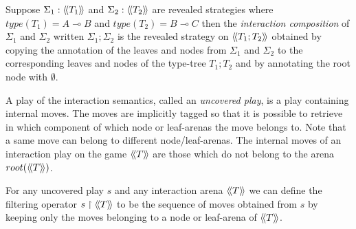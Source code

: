 \begin{dfn}
Suppose $\Sigma_1 : {\langle\!\langle T_1 \rangle\!\rangle}$ and $\Sigma_2 : {\langle\!\langle T_2 \rangle\!\rangle}$
are revealed strategies where $type(T_1) = A \multimap B$ and
$type(T_2) = B \multimap C$ then the \emph{interaction composition}
of $\Sigma_1$ and $\Sigma_2$ written $\Sigma_1 ; \Sigma_2$ is the
revealed strategy on ${\langle\!\langle T_1 ; T_2 \rangle\!\rangle}$ obtained by copying the
annotation of the leaves and nodes from $\Sigma_1$ and $\Sigma_2$ to
the corresponding leaves and nodes of the type-tree $T_1 ; T_2$ and
by annotating the root node with $\emptyset$.
\end{dfn}

A play of the interaction semantics, called an \emph{uncovered
play}, is a play containing internal moves.
The moves are implicitly tagged so that it is possible to retrieve in which component
of which node or leaf-arenas the move belongs to. Note that a same move can belong to different node/leaf-arenas.
The internal moves of an interaction play on the game ${\langle\!\langle T \rangle\!\rangle}$ are those which do not
belong to the arena $root({\langle\!\langle T \rangle\!\rangle})$.

For any uncovered play $s$ and any interaction arena ${\langle\!\langle T \rangle\!\rangle}$
we can define the filtering operator $s\upharpoonright {\langle\!\langle T \rangle\!\rangle}$ to be the
sequence of moves obtained from $s$ by keeping only the moves
belonging to a node or leaf-arena of ${\langle\!\langle T \rangle\!\rangle}$.


